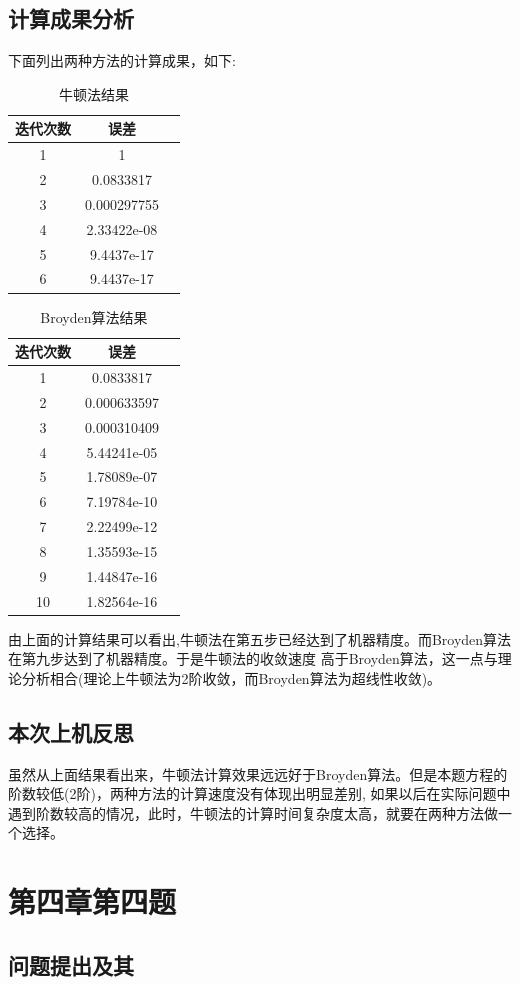 \documentclass{ctexart}
\begin{document}
\subsection{计算成果分析}
下面列出两种方法的计算成果，如下:
\begin{center}
    \begin{longtable}{|c|c|c|}
        \caption{牛顿法结果} \\
        \hline
        迭代次数& 误差 \\
        \hline
        1& 1 \\
        \hline
        2& 0.0833817 \\
        \hline
        3& 0.000297755 \\
        \hline
        4& 2.33422e-08 \\
        \hline
        5& 9.4437e-17 \\
        \hline
        6& 9.4437e-17 \\
        \hline
    \end{longtable}
\end{center}
\begin{center}
    \begin{longtable}{|c|c|c|}
        \caption{Broyden算法结果} \\
        \hline
        迭代次数& 误差 \\
        \hline
        1& 0.0833817\\
        \hline
        2& 0.000633597 \\
        \hline
        3& 0.000310409 \\
        \hline
        4& 5.44241e-05 \\
        \hline
        5& 1.78089e-07 \\
        \hline
        6& 7.19784e-10 \\
        \hline
        7& 2.22499e-12 \\
        \hline
        8& 1.35593e-15 \\
        \hline
        9& 1.44847e-16 \\
        \hline
        10& 1.82564e-16 \\
        \hline
    \end{longtable}
\end{center}

由上面的计算结果可以看出,牛顿法在第五步已经达到了机器精度。而Broyden算法在第九步达到了机器精度。于是牛顿法的收敛速度
高于Broyden算法，这一点与理论分析相合(理论上牛顿法为2阶收敛，而Broyden算法为超线性收敛)。
\subsection{本次上机反思}
虽然从上面结果看出来，牛顿法计算效果远远好于Broyden算法。但是本题方程的阶数较低(2阶)，两种方法的计算速度没有体现出明显差别,
如果以后在实际问题中遇到阶数较高的情况，此时，牛顿法的计算时间复杂度太高，就要在两种方法做一个选择。
\section{第四章第四题}
\subsection{问题提出及其}
\end{document}
